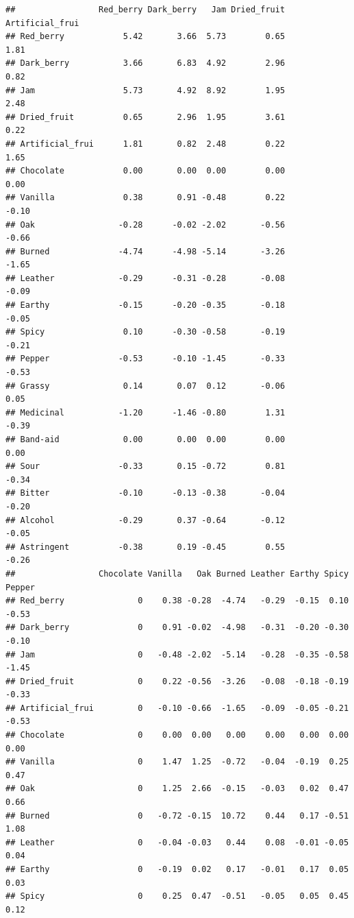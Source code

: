 \documentclass[
]{book}
\begin{document}
\begin{verbatim}
##                 Red_berry Dark_berry   Jam Dried_fruit Artificial_frui
## Red_berry            5.42       3.66  5.73        0.65            1.81
## Dark_berry           3.66       6.83  4.92        2.96            0.82
## Jam                  5.73       4.92  8.92        1.95            2.48
## Dried_fruit          0.65       2.96  1.95        3.61            0.22
## Artificial_frui      1.81       0.82  2.48        0.22            1.65
## Chocolate            0.00       0.00  0.00        0.00            0.00
## Vanilla              0.38       0.91 -0.48        0.22           -0.10
## Oak                 -0.28      -0.02 -2.02       -0.56           -0.66
## Burned              -4.74      -4.98 -5.14       -3.26           -1.65
## Leather             -0.29      -0.31 -0.28       -0.08           -0.09
## Earthy              -0.15      -0.20 -0.35       -0.18           -0.05
## Spicy                0.10      -0.30 -0.58       -0.19           -0.21
## Pepper              -0.53      -0.10 -1.45       -0.33           -0.53
## Grassy               0.14       0.07  0.12       -0.06            0.05
## Medicinal           -1.20      -1.46 -0.80        1.31           -0.39
## Band-aid             0.00       0.00  0.00        0.00            0.00
## Sour                -0.33       0.15 -0.72        0.81           -0.34
## Bitter              -0.10      -0.13 -0.38       -0.04           -0.20
## Alcohol             -0.29       0.37 -0.64       -0.12           -0.05
## Astringent          -0.38       0.19 -0.45        0.55           -0.26
##                 Chocolate Vanilla   Oak Burned Leather Earthy Spicy Pepper
## Red_berry               0    0.38 -0.28  -4.74   -0.29  -0.15  0.10  -0.53
## Dark_berry              0    0.91 -0.02  -4.98   -0.31  -0.20 -0.30  -0.10
## Jam                     0   -0.48 -2.02  -5.14   -0.28  -0.35 -0.58  -1.45
## Dried_fruit             0    0.22 -0.56  -3.26   -0.08  -0.18 -0.19  -0.33
## Artificial_frui         0   -0.10 -0.66  -1.65   -0.09  -0.05 -0.21  -0.53
## Chocolate               0    0.00  0.00   0.00    0.00   0.00  0.00   0.00
## Vanilla                 0    1.47  1.25  -0.72   -0.04  -0.19  0.25   0.47
## Oak                     0    1.25  2.66  -0.15   -0.03   0.02  0.47   0.66
## Burned                  0   -0.72 -0.15  10.72    0.44   0.17 -0.51   1.08
## Leather                 0   -0.04 -0.03   0.44    0.08  -0.01 -0.05   0.04
## Earthy                  0   -0.19  0.02   0.17   -0.01   0.17  0.05   0.03
## Spicy                   0    0.25  0.47  -0.51   -0.05   0.05  0.45   0.12

\end{verbatim}
\end{document}
